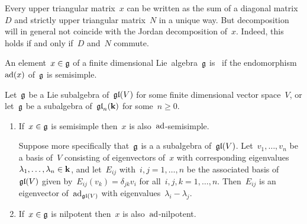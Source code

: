 \begin{warning}
  Every upper triangular matrix~$x$ can be written as the sum of a diagonal matrix~$D$ and strictly upper triangular matrix~$N$ in a unique way.
  But decomposition will in general not coincide with the Jordan decomposition of~$x$.
  Indeed, this holds if and only if~$D$ and~$N$ commute.
\end{warning}


\begin{definition}
  An element~$x \in \mathfrak{g}$ of a finite dimensional Lie~algebra~$\mathfrak{g}$ is~ if the endomorphism~$\operatorname{ad}(x)$ of~$\mathfrak{g}$ is semisimple.
\end{definition}


\begin{lemma}
  \label{ss and nilpotent implies ad-ss and ad-nilpotent}
  Let~$\mathfrak{g}$ be a Lie subalgebra of~$\mathfrak{gl}(V)$ for some finite dimensional vector space~$V$, or let~$\mathfrak{g}$ be a subalgebra of~$\mathfrak{gl}_n(\mathbf{k})$ for some~$n \geq 0$.
  \begin{enumerate}
    \item
      If~$x \in \mathfrak{g}$ is semisimple then~$x$ is also~$\operatorname{ad}$-semisimple.
      
      Suppose more specifically that~$\mathfrak{g}$ is a a subalgebra of~$\mathfrak{gl}(V)$.
      Let~$v_1, \dotsc, v_n$ be a basis of~$V$ consisting of eigenvectors of~$x$ with corresponding eigenvalues~$\lambda_1, \dotsc, \lambda_n \in \mathbf{k}$, and let~$E_{ij}$ with~$i,j = 1, \dotsc, n$ be the associated basis of~$\mathfrak{gl}(V)$ given by~$E_{ij}(v_k) = \delta_{jk} v_i$ for all~$i,j,k = 1, \dotsc, n$.
      Then~$E_{ij}$ is an eigenvector of~$\operatorname{ad}_{\mathfrak{gl}(V)}$ with eigenvalues~$\lambda_i - \lambda_j$.
    \item
      If~$x \in \mathfrak{g}$ is nilpotent then~$x$ is also~$\operatorname{ad}$-nilpotent.
  \end{enumerate}
\end{lemma}


